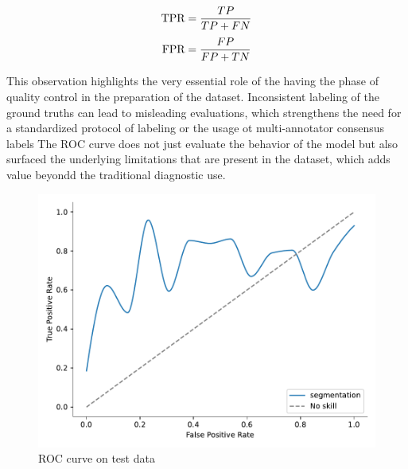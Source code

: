 \begin{equation}
\addcontentsline{equ}{equations}{\protect\numberline{\theequation}True Positive Rate}
\text{TPR} = \frac{TP}{TP + FN}
\end{equation}
\begin{equation}
\addcontentsline{equ}{equations}{\protect\numberline{\theequation}False Positive Rate}
\text{FPR} = \frac{FP}{FP + TN}
\end{equation}

This observation highlights the very essential role of the having the phase of quality control in the preparation of the dataset. Inconsistent labeling of the ground truths can lead to misleading evaluations, which strengthens the need for a standardized protocol of labeling or the usage ot multi-annotator consensus labels The ROC curve does not just evaluate the behavior of the model but also surfaced the underlying limitations that are present in the dataset, which adds value beyondd the traditional diagnostic use.

\begin{figure}[htb!] %
\centering
\centering
\includegraphics[width=1\textwidth]{images/ROC.pdf}
\caption{\centering ROC curve on test data}
\label{Fig:roc}
\end{figure}

